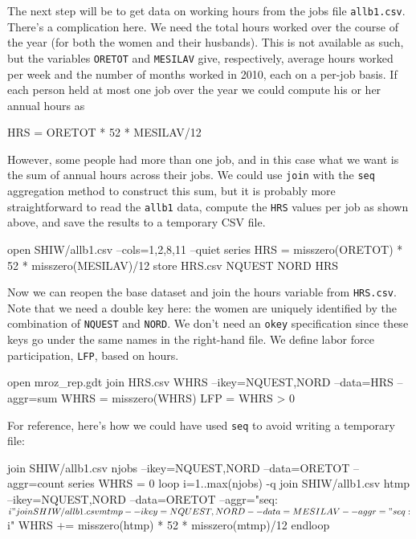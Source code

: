 The next step will be to get data on working hours from the jobs file
\texttt{allb1.csv}. There's a complication here. We need the total
hours worked over the course of the year (for both the women and their
husbands). This is not available as such, but the variables
\texttt{ORETOT} and \texttt{MESILAV} give, respectively, average hours
worked per week and the number of months worked in 2010, each on a
per-job basis. If each person held at most one job over the year we
could compute his or her annual hours as
\begin{code}
HRS = ORETOT * 52 * MESILAV/12
\end{code}
However, some people had more than one job, and in this case what we
want is the sum of annual hours across their jobs.  We could use
\texttt{join} with the \texttt{seq} aggregation method to construct
this sum, but it is probably more straightforward to read the
\texttt{allb1} data, compute the \texttt{HRS} values per job as shown
above, and save the results to a temporary CSV file.
%
\begin{code}
open SHIW/allb1.csv --cols=1,2,8,11 --quiet
series HRS = misszero(ORETOT) * 52 * misszero(MESILAV)/12
store HRS.csv NQUEST NORD HRS
\end{code}

Now we can reopen the base dataset and join the hours variable from
\texttt{HRS.csv}.  Note that we need a double key here: the women are
uniquely identified by the combination of \texttt{NQUEST} and
\texttt{NORD}. We don't need an \texttt{okey} specification since
these keys go under the same names in the right-hand file. We define
labor force participation, \texttt{LFP}, based on hours.
%
\begin{code}
open mroz_rep.gdt
join HRS.csv WHRS --ikey=NQUEST,NORD --data=HRS --aggr=sum
WHRS = misszero(WHRS)
LFP = WHRS > 0
\end{code}
%
For reference, here's how we could have used \texttt{seq} to avoid
writing a temporary file:
%
\begin{code}
join SHIW/allb1.csv njobs --ikey=NQUEST,NORD --data=ORETOT --aggr=count
series WHRS = 0
loop i=1..max(njobs) -q
  join SHIW/allb1.csv htmp --ikey=NQUEST,NORD --data=ORETOT --aggr="seq:$i"
  join SHIW/allb1.csv mtmp --ikey=NQUEST,NORD --data=MESILAV --aggr="seq:$i"
  WHRS += misszero(htmp) * 52 * misszero(mtmp)/12 
endloop
\end{code}

